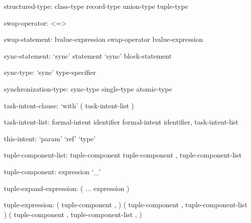 \begin{syntax}
structured-type:
  class-type
  record-type
  union-type
  tuple-type
\end{syntax}

\begin{syntax}
swap-operator:
  <=>
\end{syntax}

\begin{syntax}
swap-statement:
  lvalue-expression swap-operator lvalue-expression
\end{syntax}

\begin{syntax}
sync-statement:
  `sync' statement
  `sync' block-statement
\end{syntax}

\begin{syntax}
sync-type:
  `sync' type-specifier
\end{syntax}

\begin{syntax}
synchronization-type:
  sync-type
  single-type
  atomic-type
\end{syntax}

\begin{syntax}
task-intent-clause:
  `with' ( task-intent-list )
\end{syntax}

\begin{syntax}
task-intent-list:
  formal-intent identifier
  formal-intent identifier, task-intent-list
\end{syntax}

\begin{syntax}
this-intent:
  `param'
  `ref'
  `type'
\end{syntax}

\begin{syntax}
tuple-component-list:
  tuple-component
  tuple-component , tuple-component-list
\end{syntax}

\begin{syntax}
tuple-component:
  expression
  `_'
\end{syntax}

\begin{syntax}
tuple-expand-expression:
  ( ... expression )
\end{syntax}

\begin{syntax}
tuple-expression:
  ( tuple-component , )
  ( tuple-component , tuple-component-list )
  ( tuple-component , tuple-component-list , )
\end{syntax}

